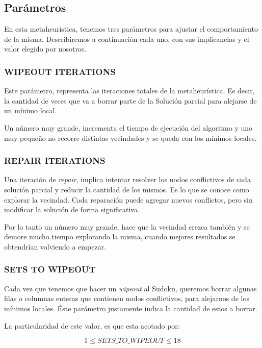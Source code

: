 \documentclass[a4paper,spanish]{article}
\begin{document}
\subsection{Parámetros}

En esta metaheurística, tenemos tres parámetros para ajustar el comportamiento de la misma.
Describiremos a continuación cada uno, con sus implicancias y el valor elegido por nosotros.


\subsubsection{WIPEOUT ITERATIONS}

Este parámetro, representa las iteraciones totales de la metaheurística.
Es decir, la cantidad de veces que va a borrar parte de la Solución parcial
para alejarse de un mínimo local.

Un número muy grande, incrementa el tiempo de ejecución del algoritmo y uno muy pequeño
no recorre distintas vecindades y se queda con los mínimos locales.


\subsubsection{REPAIR ITERATIONS}

Una iteración de \emph{repair}, implica intentar resolver los nodos conflictivos de
cada solución parcial y reducir la cantidad de los mismos. Es lo que se conoce como
explorar la vecindad. Cada reparación puede agregar nuevos conflictos, pero sin modificar
la solución de forma significativa.

Por lo tanto un número muy grande, hace que la vecindad crezca también y se demore mucho
tiempo explorando la misma, cuando mejores resultados se obtendrían volviendo a empezar.


\subsubsection{SETS TO WIPEOUT}

Cada vez que tenemos que hacer un \emph{wipeout} al Sudoku, queremos borrar algunas filas o
columnas enteras que contienen nodos conflictivos, para alejarnos de los mínimos locales.
Éste parámetro justamente indica la cantidad de estos a borrar.

La particularidad de este valor, es que esta acotado por: 

\begin{equation}
	1 \leq SETS\_TO\_WIPEOUT \leq 18
\end{equation}
\end{document}
